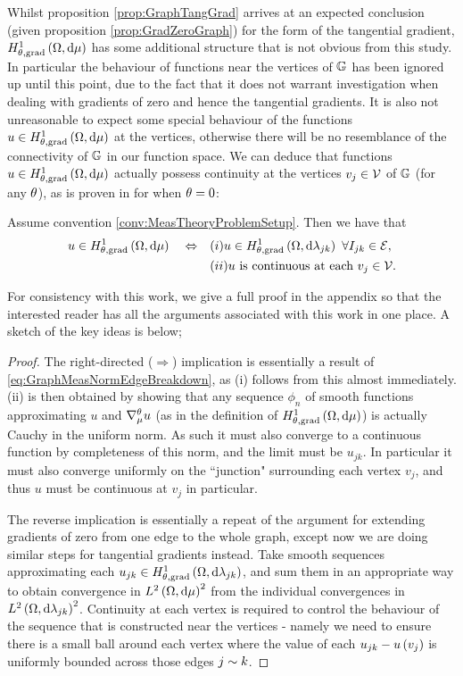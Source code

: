 Whilst proposition \ref{prop:GraphTangGrad} arrives at an expected conclusion (given proposition \ref{prop:GradZeroGraph}) for the form of the tangential gradient, $H^1_{\theta, \mathrm{grad}}\left( \Omega, \mathrm{d}\mu \right)$ has some additional structure that is not obvious from this study.
In particular the behaviour of functions near the vertices of $\mathbb{G}$ has been ignored up until this point, due to the fact that it does not warrant investigation when dealing with gradients of zero and hence the tangential gradients.
It is also not unreasonable to expect some special behaviour of the functions $u\in H^1_{\theta, \mathrm{grad}}\left( \Omega, \mathrm{d}\mu \right)$ at the vertices, otherwise there will be no resemblance of the connectivity of $\mathbb{G}$ in our function space.
We can deduce that functions $u\in H^1_{\theta, \mathrm{grad}}\left( \Omega, \mathrm{d}\mu \right)$ actually possess continuity at the vertices $v_j\in \mathcal{V}$ of $\mathbb{G}$ (for any $\theta$), as is proven in  for when $\theta=0$:
\begin{theorem} \label{thm:CharOfGradSob}
	Assume convention \ref{conv:MeasTheoryProblemSetup}.
	Then we have that
	\begin{align*}
		u\in H^1_{\theta, \mathrm{grad}}\left( \Omega, \mathrm{d}\mu \right) \quad\Leftrightarrow\quad 
		& (i) u\in H^1_{\theta, \mathrm{grad}}\left( \Omega, \mathrm{d}\lambda_{jk} \right) \ \forall I_{jk}\in \mathcal{E}, \\
		& (ii) u \text{ is continuous at each } v_j\in \mathcal{V}.
	\end{align*}
\end{theorem}
For consistency with this work, we give a full proof in the appendix so that the interested reader has all the arguments associated with this work in one place.
A sketch of the key ideas is below;
\begin{proof}
	The right-directed ($\Rightarrow$) implication is essentially a result of \eqref{eq:GraphMeasNormEdgeBreakdown}, as (i) follows from this almost immediately.
	(ii) is then obtained by showing that any sequence $\phi_n$ of smooth functions approximating $u$ and $\nabla^{\theta}_\mu u$ (as in the definition of $H^1_{\theta, \mathrm{grad}}\left( \Omega, \mathrm{d}\mu \right)$) is actually Cauchy in the uniform norm.
	As such it must also converge to a continuous function by completeness of this norm, and the limit must be $u_{jk}$.
	In particular it must also converge uniformly on the ``junction" surrounding each vertex $v_j$, and thus $u$ must be continuous at $v_j$ in particular. \newline
	
	The reverse implication is essentially a repeat of the argument for extending gradients of zero from one edge to the whole graph, except now we are doing similar steps for tangential gradients instead.
	Take smooth sequences approximating each $u_{jk}\in H^1_{\theta, \mathrm{grad}}\left( \Omega, \mathrm{d}\lambda_{jk} \right)$, and sum them in an appropriate way to obtain convergence in $L^{2}\left( \Omega,\mathrm{d}\mu \right)^2$ from the individual convergences in $L^{2}\left( \Omega,\mathrm{d}\lambda_{jk} \right)^2$.
	Continuity at each vertex is required to control the behaviour of the sequence that is constructed near the vertices - namely we need to ensure there is a small ball around each vertex where the value of each $u_{jk} - u\left( v_j \right)$ is uniformly bounded across those edges $j\sim k$.
\end{proof}